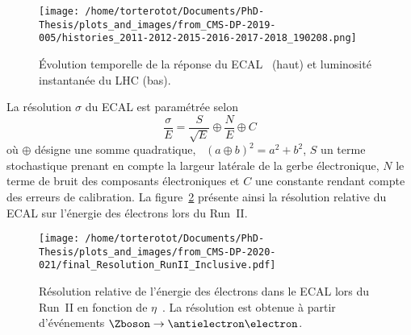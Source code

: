 \begin{figure}[h]
\centering
\texttt{[image: /home/torterotot/Documents/PhD-Thesis/plots\_and\_images/from\_CMS-DP-2019-005/histories\_2011-2012-2015-2016-2017-2018\_190208.png]}
\caption[Évolution temporelle de la réponse du ECAL.]{Évolution temporelle de la réponse du ECAL~\cite{CMS-DP-2019-005} (haut) et luminosité instantanée du LHC (bas).}
\label{fig-chapter-LHC-section-CMS-subsec-ECAL-CMS-DP-2019-005-histories_2011-2012-2015-2016-2017-2018_190208}
\end{figure}
\par La résolution $\sigma$ du ECAL est paramétrée selon
\begin{equation}
\frac{\sigma}{E}
=
\frac{S}{\sqrt{E}}
\oplus
\frac{N}{E}
\oplus
C
\end{equation}
où $\oplus$ désigne une somme quadratique, \ie\ $(a\oplus b)^2 = a^2 + b^2$,
$S$ un terme stochastique prenant en compte la largeur latérale de la gerbe électronique,
$N$ le terme de bruit des composants électroniques et
$C$ une constante rendant compte des erreurs de calibration.
La figure~\ref{fig-chapter-LHC-section-CMS-subsec-ECAL-CMS-DP-2020-021-final_Resolution_RunII_Inclusive} présente ainsi la résolution relative du ECAL sur l'énergie des électrons lors du Run~II.
\begin{figure}[h]
\centering
\texttt{[image: /home/torterotot/Documents/PhD-Thesis/plots\_and\_images/from\_CMS-DP-2020-021/final\_Resolution\_RunII\_Inclusive.pdf]}
\caption[Résolution relative de l'énergie des électrons dans le ECAL lors du Run~II.]{Résolution relative de l'énergie des électrons dans le ECAL lors du Run~II en fonction de $\eta$~\cite{CMS-DP-2020-021}. La résolution est obtenue à partir d'événements $\Zboson\to\antielectron\electron$.}
\label{fig-chapter-LHC-section-CMS-subsec-ECAL-CMS-DP-2020-021-final_Resolution_RunII_Inclusive}
\end{figure}